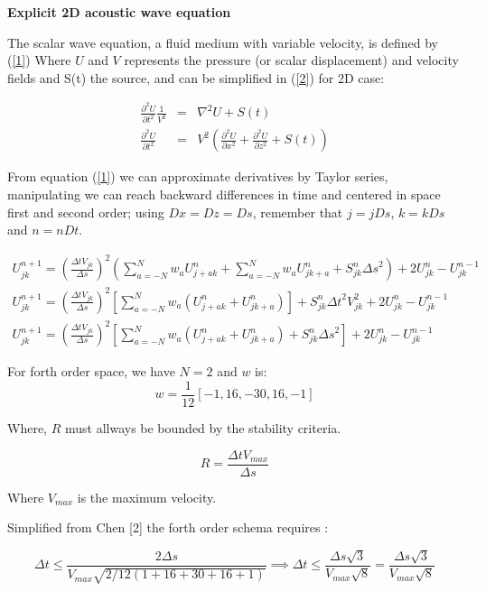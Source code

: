 \documentclass[legalpaper, 12pt]{article}
\begin{document}
\textbf{Explicit 2D acoustic wave equation }

The scalar wave equation, a fluid medium with variable velocity, is defined by (\ref{1}) Where $U$ and $V$ represents the pressure (or scalar displacement) and velocity fields and S(t) the source, and can be simplified in (\ref{2}) for 2D case:

\begin{eqnarray}
\frac{\partial^2 U}{\partial t^2} \frac{1}{V^2} &=& \nabla^2 U + S(t) \label{1} \\
\frac{\partial^2 U}{\partial t^2} &=& V^2 \left( \frac{\partial^2 U}{\partial x^2}+ \frac{\partial^2 U}{\partial z^2} +S(t) \right)
\label{2}
\end{eqnarray}

From equation (\ref{1}) we can approximate derivatives by Taylor series, manipulating we can reach backward differences in time and centered in space first and second order; using $Dx=Dz=Ds$, remember that $j=jDs$, $k=kDs$ and $n=nDt$.

\begin{multline}
U_{jk}^{n+1}  =  \left( \frac{\Delta t  V_{jk} }{\Delta s} \right) ^2 \left(  \sum_{a=-N}^N w_a U_{j+a k}^n + \sum_{a=-N}^N w_a U_{j k+a}^n +S_{jk}^n {\Delta s}^2 \right) + 2 U_{jk}^{n} - U_{jk}^{n-1}  \\
U_{jk}^{n+1}  =  \left( \frac{\Delta t  V_{jk}}{\Delta s} \right) ^2   \left[ \sum_{a=-N}^N  w_a \left( U_{j+a k}^n + U_{j k+a}^n \right) \right] + S_{jk}^n {\Delta t}^2 V_{jk}^2 + 2 U_{jk}^{n} - U_{jk}^{n-1} \\
U_{jk}^{n+1}  =  \left( \frac{\Delta t  V_{jk}}{\Delta s} \right) ^2  \left[ \sum_{a=-N}^N  w_a \left( U_{j+a k}^n + U_{j k+a}^n \right) + S_{jk}^n {\Delta s}^2\right] + 2 U_{jk}^{n} - U_{jk}^{n-1} \label{3}
\end{multline}

For forth order space, we have $N=2$ and $w$ is:
$$ w = \frac{1}{12} [-1, 16, -30, 16, -1] $$

Where, $ R $ must allways be bounded by the stability criteria.

\[ R = \frac{\Delta t  V_{max}}{\Delta s} \]

Where $V_{max}$ is the maximum velocity.

Simplified from Chen [2] the forth order schema requires :

$$ \Delta t \leq \frac{2 \Delta s}{ V_{max} \sqrt{2/12(1+16+30+16+1)}} \implies \Delta t \leq \frac{ \Delta s \sqrt{3}}{ V_{max} \sqrt{8}} = \frac{ \Delta s \sqrt{3}}{ V_{max} \sqrt{8}}$$
\end{document}
